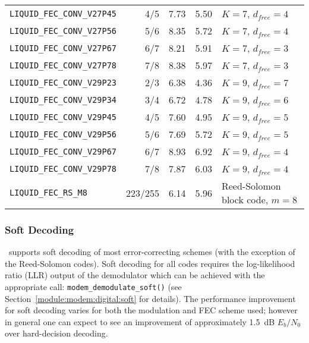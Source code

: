 \begin{table*}
{\begin{tabular*}{0.95\textwidth}{l@{\extracolsep{\fill}}rrrl}
{\tt LIQUID\_FEC\_CONV\_V27P45} & 4/5     &  7.73 & 5.50 & $K=7$, $d_{free}=4$\\
{\tt LIQUID\_FEC\_CONV\_V27P56} & 5/6     &  8.35 & 5.72 & $K=7$, $d_{free}=4$\\
{\tt LIQUID\_FEC\_CONV\_V27P67} & 6/7     &  8.21 & 5.91 & $K=7$, $d_{free}=3$\\
{\tt LIQUID\_FEC\_CONV\_V27P78} & 7/8     &  8.38 & 5.97 & $K=7$, $d_{free}=3$\\\midrule
%
{\tt LIQUID\_FEC\_CONV\_V29P23} & 2/3     &  6.38 & 4.36 & $K=9$, $d_{free}=7$\\
{\tt LIQUID\_FEC\_CONV\_V29P34} & 3/4     &  6.72 & 4.78 & $K=9$, $d_{free}=6$\\
{\tt LIQUID\_FEC\_CONV\_V29P45} & 4/5     &  7.60 & 4.95 & $K=9$, $d_{free}=5$\\
{\tt LIQUID\_FEC\_CONV\_V29P56} & 5/6     &  7.69 & 5.72 & $K=9$, $d_{free}=5$\\
{\tt LIQUID\_FEC\_CONV\_V29P67} & 6/7     &  8.93 & 6.92 & $K=9$, $d_{free}=4$\\
{\tt LIQUID\_FEC\_CONV\_V29P78} & 7/8     &  7.87 & 6.03 & $K=9$, $d_{free}=4$\\\midrule
% 
{\tt LIQUID\_FEC\_RS\_M8}       & 223/255 &  6.14 & 5.96 & Reed-Solomon block code, $m=8$\\\bottomrule


\end{tabular*}
}
\end{table*}%

\subsubsection{Soft Decoding}
\label{module:fec:soft}
\liquid\ supports soft decoding of most error-correcting schemes
(with the exception of the Reed-Solomon codes).
Soft decoding for all codes requires the log-likelihood ratio (LLR)
output of the demodulator which can be achieved with the appropriate
call: {\tt modem\_demodulate\_soft()}
(see Section~\ref{module:modem:digital:soft} for details).
The performance improvement for soft decoding varies for both the
modulation and FEC scheme used;
however in general one can expect to see an improvement of approximately
1.5~dB $E_b/N_0$ over hard-decision decoding.


